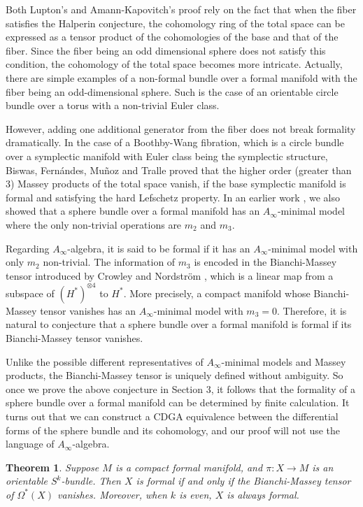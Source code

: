 \documentclass{article}
\theoremstyle{plain}
\newtheorem{thm}{Theorem}[section]
\theoremstyle{definition}
\theoremstyle{plain}
\numberwithin{equation}{section}
\begin{document}
Both Lupton's and Amann-Kapovitch's proof rely on the fact that when the fiber satisfies the Halperin conjecture, the cohomology ring of the total space can be expressed as a tensor product of the cohomologies of the base and that of the fiber. Since the fiber being an odd dimensional sphere does not satisfy this condition, the cohomology of the total space becomes more intricate. Actually, there are simple examples of a non-formal bundle over a formal manifold with the fiber being an odd-dimensional sphere. Such is the case of an orientable circle bundle over a torus with a non-trivial Euler class.

However, adding one additional generator from the fiber does not break formality dramatically. In the case of a Boothby-Wang fibration, which is a circle bundle over a symplectic manifold with Euler class being the symplectic structure, Biswas, Fern\'andes, Mu\~noz and Tralle \cite[Proposition 4.5]{biswas-et-al} proved that the higher order (greater than 3) Massey products of the total space vanish, if the base symplectic manifold is formal and satisfying the hard Lefschetz property. In an earlier work \cite{own}, we also showed that a sphere bundle over a formal manifold has an $A_{\infty}$-minimal model where the only non-trivial operations are $m_2$ and $m_3$.

Regarding $A_{\infty}$-algebra, it is said to be formal if it has an $A_{\infty}$-minimal model with only $m_2$ non-trivial. The information of $m_3$ is encoded in the Bianchi-Massey tensor introduced by Crowley and Nordstr\"{o}m \cite{cn}, which is a linear map from a subspace of $(H^*)^{\otimes 4}$ to $H^*$. More precisely, a compact manifold whose Bianchi-Massey tensor vanishes has an $A_{\infty}$-minimal model with $m_3=0$. Therefore, it is natural to conjecture that a sphere bundle over a formal manifold is formal if its Bianchi-Massey tensor vanishes.

Unlike the possible different representatives of $A_\infty$-minimal models and Massey products, the Bianchi-Massey tensor is uniquely defined without ambiguity. So once we prove the above conjecture in Section 3, it follows that the formality of a sphere bundle over a formal manifold can be determined by finite calculation. It turns out that we can construct a CDGA equivalence between the differential forms of the sphere bundle and its cohomology, and our proof will not use the language of $A_\infty$-algebra.

\begin{thm}\label{intro formality over formal}
Suppose $M$ is a compact formal manifold, and $\pi:X\to M$ is an orientable $S^k$-bundle. Then $X$ is formal if and only if the Bianchi-Massey tensor of $\Omega^*(X)$ vanishes. Moreover, when $k$ is even, $X$ is always formal.
\end{thm}
\end{document}
